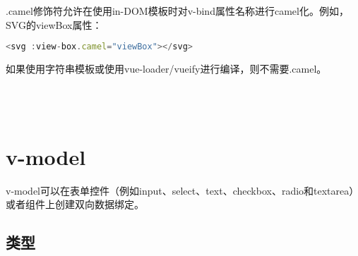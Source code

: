 \begin{compactitem}
\item .camel修饰符允许在使用in-DOM模板时对v-bind属性名称进行camel化。例如，SVG的viewBox属性：

\begin{lstlisting}[language=JavaScript]
<svg :view-box.camel="viewBox"></svg>
\end{lstlisting}


\item 如果使用字符串模板或使用vue-loader/vueify进行编译，则不需要.camel。
\end{compactitem}



\begin{lstlisting}[language=JavaScript]

\end{lstlisting}




\begin{lstlisting}[language=JavaScript]

\end{lstlisting}




\begin{lstlisting}[language=JavaScript]

\end{lstlisting}




\begin{lstlisting}[language=JavaScript]

\end{lstlisting}


\chapter{v-model}



v-model可以在表单控件（例如input、select、text、checkbox、radio和textarea）或者组件上创建双向数据绑定。


\section{类型}

